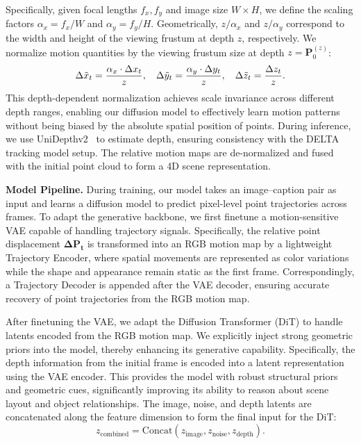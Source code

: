 Specifically, given focal lengths $f_x, f_y$ and image size $W \times H$, we define the scaling factors $\alpha_x =  f_x / W $ and $\alpha_y =  f_y / H  $. Geometrically, $z / \alpha_x $ and $  z/\alpha_y$ correspond to the width and height of the viewing frustum at depth $z$, respectively. We normalize motion quantities by the viewing frustum size at depth $z = \mathbf{P}^{(z)}_{0}$:
\begin{equation}
\small
\Delta \tilde{x}_t = \frac{\alpha_x\cdot \Delta x_t }{z }, \quad \Delta \tilde{y}_t = \frac{\alpha_y\cdot \Delta y_t }{z}, \quad \Delta \tilde{z}_t = \frac{\Delta z_t}{z}.
\label{eq:norm}
\end{equation}
This depth-dependent normalization achieves scale invariance across different depth ranges, enabling our diffusion model to effectively learn motion patterns without being biased by the absolute spatial position of points. During inference, we use UniDepthv2~\cite{unidepthv2} to estimate depth, ensuring consistency with the DELTA tracking model setup. The relative motion maps are de-normalized and fused with the initial point cloud to form a 4D scene representation.

\vspace{3pt}
\noindent\textbf{Model Pipeline.}
During training, our model takes an image–caption pair as input and learns a diffusion model to predict pixel-level point trajectories across frames. To adapt the generative backbone, we first finetune a motion-sensitive VAE capable of handling trajectory signals. Specifically, the relative point displacement $\mathbf{\Delta P_t}$ is transformed into an RGB motion map by a lightweight Trajectory Encoder, where spatial movements are represented as color variations while the shape and appearance remain static as the first frame. Correspondingly, a Trajectory Decoder is appended after the VAE decoder, ensuring accurate recovery of point trajectories from the RGB motion map.

After finetuning the VAE, we adapt the Diffusion Transformer (DiT) to handle latents encoded from the RGB motion map. We explicitly inject strong geometric priors into the model, thereby enhancing its generative capability. Specifically, the depth information from the initial frame is encoded into a latent representation using the VAE encoder. This provides the model with robust structural priors and geometric cues, significantly improving its ability to reason about scene layout and object relationships. The image, noise, and depth latents are concatenated along the feature dimension to form the final input for the DiT: 
\begin{equation}
z_{\text{combined}} = \text{Concat}(z_{\text{image}}, z_{\text{noise}}, z_{\text{depth}}).
\label{eq:latent_concat}
\end{equation}

